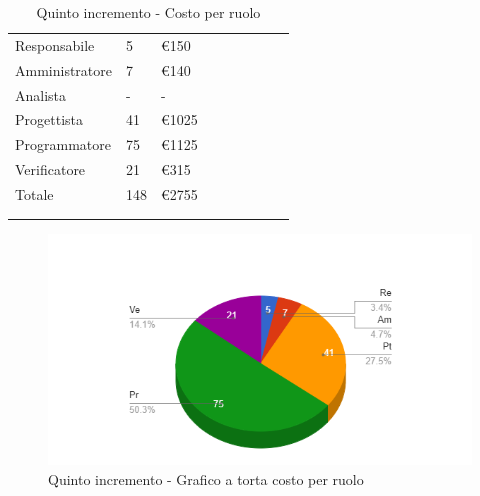 {{\begin{longtable}{C{.4\freewidth} C{.2\freewidth} C{.2\freewidth} C{.2\freewidth} C{.2\freewidth} C{.2\freewidth} C{.2\freewidth} C{.2\freewidth} C{.2\freewidth}}
        Responsabile  & 5 & €150\\
        Amministratore  & 7 & €140 \\
        Analista &- & -\\
        Progettista &41 &€1025\\
        Programmatore &75 & €1125\\
        Verificatore &21 &€315\\
        Totale&148&€2755\\
        \bottomrule
      \\
        \caption{Quinto incremento - Costo per ruolo}

        \end{longtable}
        \begin{figure}[H]
          \includegraphics[width=15cm]{sezioni/Images/quintoT.png}
          \centering
          \caption{Quinto incremento - Grafico a torta costo per ruolo}
       \end{figure}
    }
    }

